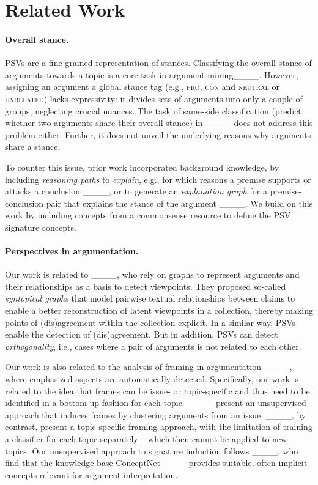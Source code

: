 \section{Related Work}
\paragraph{Overall stance.} 
PSVs are a fine-grained representation of stances. Classifying the overall stance of arguments towards a topic is a core task in argument mining____. 
However, assigning an argument a global stance tag (e.g., \textsc{pro}, \textsc{con} and \textsc{neutral} or \textsc{unrelated}) lacks expressivity: it divides sets of arguments into only a couple of groups, neglecting crucial nuances. The task of same-side classification (predict whether two arguments share their overall stance) in ____ does not address this problem either. Further, it does not unveil the underlying reasons why arguments share a stance. 

To counter this issue, prior work incorporated background knowledge, by including \textit{reasoning paths} to \textit{explain}, e.g., for which reasons a premise supports or attacks a conclusion ____, or to generate an \textit{explanation graph} for a premise-conclusion pair that explains the stance of the argument ____. We build on this work by including concepts from a commonsense resource to define the PSV signature concepts. %


\paragraph{Perspectives in argumentation.}

Our work is related to ____, who rely on graphs to represent arguments and their relationships as a basis to detect viewpoints. They proposed so-called \textit{syntopical graphs} that model pairwise textual relationships between claims to enable a better reconstruction of latent viewpoints in a collection, thereby making points of (dis)agreement within the collection explicit. %
In a similar way, PSVs enable the detection of (dis)agreement. But in addition, %
PSVs can detect \textit{orthogonality}, i.e., cases where a pair of arguments is not 
related to each other. 

Our work is also related to the analysis of framing in argumentation 
____, where emphasized aspects are automatically detected. %
Specifically, our work is related to the idea that frames %
can be issue- or topic-specific and thus need to be identified in a bottom-up fashion for each topic. 
____ present an unsupervised approach that induces frames by clustering arguments from an issue. 
____, by contrast, present a topic-specific framing approach, with the limitation of training a classifier for each topic separately -- which then cannot be applied to new topics. 
Our unsupervised approach to signature induction follows ____, who find that the knowledge base ConceptNet____ provides suitable, often implicit concepts relevant for argument interpretation. %

